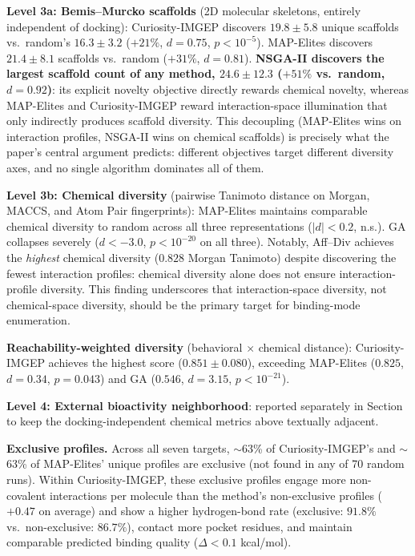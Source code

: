 \documentclass[journal=jcisd8,manuscript=article]{achemso}
\begin{document}
\textbf{Level 3a: Bemis--Murcko scaffolds}\cite{bemis1996properties} (2D molecular skeletons, entirely independent of docking): Curiosity-IMGEP discovers $19.8 \pm 5.8$ unique scaffolds vs.\ random's $16.3 \pm 3.2$ ($+21\%$, $d = 0.75$, $p < 10^{-5}$). MAP-Elites discovers $21.4 \pm 8.1$ scaffolds vs.\ random ($+31\%$, $d = 0.81$). \textbf{NSGA-II discovers the largest scaffold count of any method, $24.6 \pm 12.3$ ($+51\%$ vs.\ random, $d = 0.92$)}: its explicit novelty objective directly rewards chemical novelty, whereas MAP-Elites and Curiosity-IMGEP reward interaction-space illumination that only indirectly produces scaffold diversity. This decoupling (MAP-Elites wins on interaction profiles, NSGA-II wins on chemical scaffolds) is precisely what the paper's central argument predicts: different objectives target different diversity axes, and no single algorithm dominates all of them.

\textbf{Level 3b: Chemical diversity} (pairwise Tanimoto distance on Morgan, MACCS, and Atom Pair fingerprints): MAP-Elites maintains comparable chemical diversity to random across all three representations ($|d| < 0.2$, n.s.). GA collapses severely ($d < -3.0$, $p < 10^{-20}$ on all three). Notably, Aff--Div achieves the \emph{highest} chemical diversity ($0.828$ Morgan Tanimoto) despite discovering the fewest interaction profiles: chemical diversity alone does not ensure interaction-profile diversity. This finding underscores that interaction-space diversity, not chemical-space diversity, should be the primary target for binding-mode enumeration.

\textbf{Reachability-weighted diversity} (behavioral $\times$ chemical distance): Curiosity-IMGEP achieves the highest score ($0.851 \pm 0.080$), exceeding MAP-Elites ($0.825$, $d = 0.34$, $p = 0.043$) and GA ($0.546$, $d = 3.15$, $p < 10^{-21}$).

\textbf{Level 4: External bioactivity neighborhood}: reported separately in Section~ to keep the docking-independent chemical metrics above textually adjacent.

\textbf{Exclusive profiles.} Across all seven targets, $\sim$63\% of Curiosity-IMGEP's and $\sim$63\% of MAP-Elites' unique profiles are exclusive (not found in any of 70 random runs). Within Curiosity-IMGEP, these exclusive profiles engage more non-covalent interactions per molecule than the method's non-exclusive profiles ($+0.47$ on average) and show a higher hydrogen-bond rate (exclusive: $91.8\%$ vs.\ non-exclusive: $86.7\%$), contact more pocket residues, and maintain comparable predicted binding quality ($\Delta < 0.1$ kcal/mol).
\end{document}
